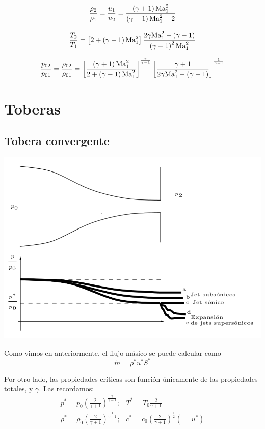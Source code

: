		
\begin{equation}			\frac{\rho_{2}}{\rho_{1}}=\frac{u_{1}}{u_{2}}=\frac{\left(\gamma+1\right)\text{Ma}_{1}^{2}}{\left(\gamma-1\right)\text{Ma}_{1}^{2}+2}
\end{equation}
		
		
		
		\begin{equation}
			\frac{T_{2}}{T_{1}}=\left[2+\left(\gamma-1\right)\text{Ma}_{1}^{2}\right]\frac{2\gamma\text{Ma}_{1}^{2}-\left(\gamma-1\right)}{\left(\gamma+1\right)^{2}\text{Ma}_{1}^{2}}
		\end{equation}
		
		
		
		\begin{equation}
			\frac{p_{02}}{p_{01}}=\frac{\rho_{02}}{\rho_{01}}=\left[\frac{\left(\gamma+1\right)\text{Ma}_{1}^{2}}{2+\left(\gamma-1\right)\text{Ma}_{1}^{2}}\right]^{\frac{\gamma}{\gamma-1}}\left[\frac{\gamma+1}{2\gamma\text{Ma}_{1}^{2}-\left(\gamma-1\right)}\right]^{\frac{1}{\gamma-1}}
		\end{equation}
		
\section{Toberas}

\subsection{Tobera convergente}

\begin{center}
	\includegraphics[width=0.7\linewidth]{TeX_files/chapter11-Compresible/tobera_convergente}
\end{center}


	Como vimos en anteriormente, el flujo másico se puede calcular
	como
	\[
	\dot{m}=\rho^{*}u^{*}S^{*}
	\]
	
	Por otro lado, las propiedades críticas son función únicamente de
	las propiedades totales, y $\gamma$. Las recordamos:
	\[
	\begin{array}{cc}
		p^{*}=p_{0}\left(\frac{2}{\gamma+1}\right)^{\frac{\gamma}{\gamma-1}}; & T^{*}=T_{0}\frac{2}{\gamma+1}\\
		\rho^{*}=\rho_{0}\left(\frac{2}{\gamma+1}\right)^{\frac{1}{\gamma-1}}; & c^{*}=c_{0}\left(\frac{2}{\gamma+1}\right)^{\frac{1}{2}}(=u^{*})
	\end{array}
	\]
	
